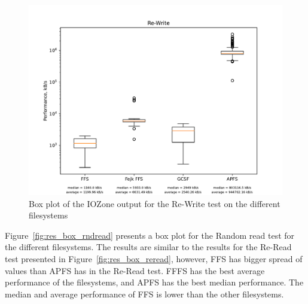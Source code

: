 \begin{figure}[!ht]
	\label{fig:res_box_rewrite}
	\begin{center}
		\includegraphics[width=1.0\textwidth]{figures/benchmarking/Re-Write_box.pdf}
	\end{center}
	\caption{Box plot of the IOZone output for the Re-Write test on the different filesystems}
\end{figure}

\FloatBarrier

Figure~\ref{fig:res_box_rndread} presents a box plot for the Random read test for the different filesystems. The results are similar to the results for the \mbox{Re-Read} test presented in Figure~\ref{fig:res_box_reread}, however, \gls{FFS} has bigger spread of values than \gls{APFS} has in the \mbox{Re-Read} test. \gls{FFFS} has the best average performance of the filesystems, and \gls{APFS} has the best median performance. The median and average performance of \gls{FFS} is lower than the other filesystems.


